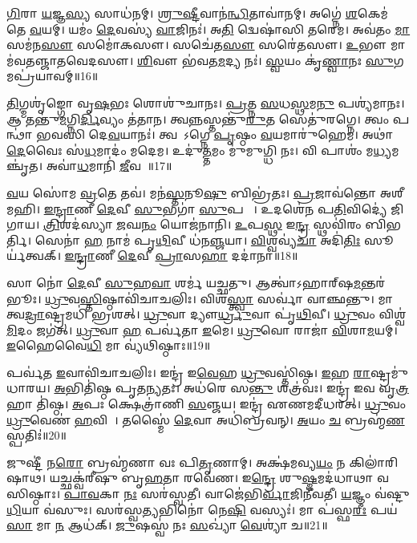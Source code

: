 \ul{𑌗𑌿}𑌰𑌾 \ul{𑌯}𑌜𑍍𑌞\ul{𑌸𑍍𑌯} 𑌸𑌾𑌧॑𑌨𑌮𑍍।
\ul{𑌶𑍍𑌰𑍁}\ul{𑌷𑍍𑌟𑍀}𑌵𑌾𑌨॑\ul{𑌨𑍍𑌧𑌿}𑌤𑌾𑌵𑌾॑𑌨𑌮𑍍।
𑌅𑌗𑍍𑌨𑍇॑ \ul{𑌶}𑌕𑍇𑌮॑ 𑌤𑍇 \ul{𑌵}𑌯𑌮𑍍।
𑌯𑌮𑌂॑ \ul{𑌦𑍇}𑌵𑌸𑍍𑌯॑ \ul{𑌵𑌾}𑌜𑌿𑌨𑌃॑।
𑌅\ul{𑌤𑌿} 𑌦𑍍𑌵𑍇𑌷𑌾॑𑌸𑌿 𑌤𑌰𑍇𑌮।
𑌅𑌵॑𑌤𑌂 \ul{𑌮𑌾} 𑌸𑌮॑𑌨\ul{𑌸𑍗} 𑌸𑌮𑍋॑𑌕𑌸𑍗।
𑌸𑌚𑍇॑𑌤\ul{𑌸𑍗} 𑌸𑌰𑍇॑𑌤𑌸𑍗।
\ul{𑌉}𑌭𑍗 𑌮𑌾𑌮॑𑌵𑌤𑌞𑍍𑌜𑌾𑌤𑌵𑍇𑌦𑌸𑍗।
\ul{𑌶𑌿}𑌵𑍗 𑌭॑𑌵𑌤\ul{𑌮}𑌦𑍍𑌯 𑌨𑌃॑।
\ul{𑌸𑍍𑌵}𑌯𑌂 𑌕𑍃॑\ul{𑌣𑍍𑌵𑌾}𑌨𑌃 \ul{𑌸𑍁}𑌗𑌮𑌪𑍍𑌰॑𑌯𑌾𑌵𑌮𑍍॥16॥

\ul{𑌤𑌿}𑌗𑍍𑌮𑌶𑍃॑𑌙𑍍𑌗𑍋 𑌵𑍃\ul{𑌷}𑌭𑌃 𑌶𑍋𑌶𑍁॑𑌚𑌾𑌨𑌃।
\ul{𑌪𑍍𑌰}𑌤𑍍𑌨 \ul{𑌸}𑌧\ul{𑌸𑍍𑌥}𑌮\ul{𑌨𑍁} 𑌪𑌶𑍍𑌯॑𑌮𑌾𑌨𑌃।
𑌆 𑌤𑌨𑍍𑌤𑍁॑\ul{𑌮}𑌗𑍍𑌨𑌿\ul{𑌰𑍍𑌦𑌿}𑌵𑍍𑌯𑌂 𑌤॑𑌤𑌾𑌨।
𑌤𑍍𑌵\ul{𑌨𑍍𑌨}𑌸𑍍𑌤𑌨𑍍𑌤𑍁॑\ul{𑌰𑍁}𑌤 𑌸𑍇𑌤𑍁॑𑌰𑌗𑍍𑌨𑍇।
𑌤𑍍𑌵𑌂 𑌪𑌨𑍍𑌥𑌾॑ 𑌭𑌵𑌸𑌿 𑌦𑍇\ul{𑌵}𑌯𑌾𑌨𑌃॑।
𑌤𑍍𑌵𑌯𑌾᳚\-𑌽𑌗𑍍𑌨𑍇 \ul{𑌪𑍃}𑌷𑍍𑌠𑌂 \ul{𑌵}𑌯𑌮𑌾𑌰𑍁॑𑌹𑍇𑌮।
𑌅𑌥𑌾॑ \ul{𑌦𑍇}𑌵𑍈𑌃 𑌸॑\ul{𑌧}𑌮𑌾𑌦𑌂॑ 𑌮𑌦𑍇𑌮।
𑌉𑌦𑍁॑\ul{𑌤𑍍𑌤}𑌮𑌂 𑌮𑍁॑𑌮𑍁𑌗𑍍𑌧𑌿 𑌨𑌃।
𑌵𑌿 𑌪𑌾𑌶𑌂॑ 𑌮\ul{𑌧𑍍𑌯}𑌮𑌞𑍍𑌚𑍃॑𑌤।
𑌅𑌵𑌾॑\ul{𑌧}𑌮𑌾𑌨𑌿॑ \ul{𑌜𑍀}𑌵𑌸𑍇᳚॥17॥

\ul{𑌵}𑌯 𑌸𑍋॑𑌮 \ul{𑌵𑍍𑌰}𑌤𑍇 𑌤𑌵॑।
𑌮𑌨॑\ul{𑌸𑍍𑌤}𑌨𑍂\ul{𑌷𑍁} 𑌬𑌿𑌭𑍍𑌰॑𑌤𑌃।
\ul{𑌪𑍍𑌰}𑌜𑌾𑌵॑𑌨𑍍𑌤𑍋 𑌅𑌶𑍀𑌮𑌹𑌿।
\ul{𑌇}\ul{𑌨𑍍𑌦𑍍𑌰𑌾}𑌣𑍀 \ul{𑌦𑍇}𑌵𑍀 \ul{𑌸𑍁}𑌭𑌗𑌾॑ \ul{𑌸𑍁}𑌪𑌤𑍍𑌨𑍀᳚।
𑌉𑌦𑌶𑍇॑𑌨 𑌪\ul{𑌤𑌿}𑌵𑌿𑌦𑍍𑌯𑍇॑ 𑌜𑌿𑌗𑌾𑌯।
\ul{𑌤𑍍𑌰𑌿}\ul{}𑌶𑌦॑𑌸𑍍𑌯𑌾 \ul{𑌜}𑌘\ul{𑌨𑌂} 𑌯𑍋𑌜॑𑌨𑌾𑌨𑌿।
\ul{𑌉}𑌪\ul{𑌸𑍍𑌥} 𑌇\ul{𑌨𑍍𑌦𑍍𑌰}\ul{} 𑌸𑍍𑌥𑌵𑌿॑𑌰𑌂 𑌬𑌿𑌭𑌰𑍍𑌤𑌿।
𑌸𑍇𑌨𑌾॑ \ul{𑌹} 𑌨𑌾𑌮॑ 𑌪𑍃\ul{𑌥𑌿}𑌵𑍀 𑌧॑𑌨\ul{𑌞𑍍𑌜}𑌯𑌾।
\ul{𑌵𑌿}𑌶𑍍𑌵𑌵𑍍𑌯॑\ul{𑌚𑌾} 𑌅𑌦𑌿॑\ul{𑌤𑌿𑌃} 𑌸𑍂𑌰𑍍𑌯॑𑌤𑍍𑌵𑌕𑍍।
\ul{𑌇}\ul{𑌨𑍍𑌦𑍍𑌰𑌾}𑌣𑍀 \ul{𑌦𑍇}𑌵𑍀 \ul{𑌪𑍍𑌰𑌾}𑌸\ul{𑌹𑌾} 𑌦𑌦𑌾॑𑌨𑌾॥18॥

𑌸𑌾 𑌨𑍋॑ \ul{𑌦𑍇}𑌵𑍀 \ul{𑌸𑍁}𑌹\ul{𑌵𑌾} 𑌶𑌰𑍍𑌮॑ 𑌯𑌚𑍍𑌛𑌤𑍁।
𑌆𑌤𑍍𑌵𑌾॑\-𑌽𑌹𑌾𑌰𑍍‌\mbox{}𑌷\ul{𑌮}𑌨𑍍𑌤𑌰॑𑌭𑍂𑌃।
\ul{𑌧𑍍𑌰𑍁}𑌵\ul{𑌸𑍍𑌤𑌿}𑌷𑍍𑌠𑌾𑌵𑌿॑𑌚𑌾𑌚𑌲𑌿𑌃।
𑌵𑌿𑌶॑\ul{𑌸𑍍𑌤𑍍𑌵𑌾} 𑌸𑌰𑍍𑌵𑌾॑ 𑌵𑌾𑌞𑍍𑌛𑌨𑍍𑌤𑍁।
𑌮𑌾 𑌤𑍍𑌵\ul{𑌦𑍍𑌰𑌾}𑌷𑍍𑌟𑍍𑌰𑌮𑌧𑌿॑ 𑌭𑍍𑌰𑌶𑌤𑍍।
\ul{𑌧𑍍𑌰𑍁}𑌵𑌾 𑌦𑍍𑌯𑍗\ul{𑌰𑍍𑌧𑍍𑌰𑍁}𑌵𑌾 𑌪𑍃॑\ul{𑌥𑌿}𑌵𑍀।
\ul{𑌧𑍍𑌰𑍁}𑌵𑌂 𑌵𑌿𑌶𑍍𑌵॑\ul{𑌮𑌿}𑌦𑌂 𑌜𑌗॑𑌤𑍍।
\ul{𑌧𑍍𑌰𑍁}𑌵𑌾 \ul{𑌹} 𑌪𑌰𑍍𑌵॑𑌤𑌾 \ul{𑌇}𑌮𑍇।
\ul{𑌧𑍍𑌰𑍁}𑌵𑍋 𑌰𑌾𑌜𑌾॑ \ul{𑌵𑌿}𑌶𑌾\ul{𑌮}𑌯𑌮𑍍।
\ul{𑌇}𑌹𑍈𑌵𑍈\ul{𑌧𑌿} 𑌮𑌾 𑌵𑍍𑌯॑𑌥𑌿𑌷𑍍𑌠𑌾𑌃॥19॥

𑌪𑌰𑍍𑌵॑𑌤 \ul{𑌇}𑌵𑌾𑌵𑌿॑𑌚𑌾𑌚𑌲𑌿𑌃।
𑌇𑌨𑍍𑌦𑍍𑌰॑ 𑌇\ul{𑌵𑍇}𑌹 \ul{𑌧𑍍𑌰𑍁}𑌵𑌸𑍍𑌤𑌿॑𑌷𑍍𑌠।
\ul{𑌇}𑌹 \ul{𑌰𑌾}𑌷𑍍𑌟𑍍𑌰𑌮𑍁॑ 𑌧𑌾𑌰𑌯।
\ul{𑌅}𑌭𑌿𑌤𑌿॑𑌷𑍍𑌠 𑌪𑍃𑌤\ul{𑌨𑍍𑌯}𑌤𑌃।
𑌅𑌧॑𑌰𑍇 𑌸\ul{𑌨𑍍𑌤𑍁} 𑌶𑌤𑍍𑌰॑𑌵𑌃।
𑌇𑌨𑍍𑌦𑍍𑌰॑ 𑌇𑌵 𑌵𑍃\ul{𑌤𑍍𑌰}𑌹𑌾 𑌤𑌿॑𑌷𑍍𑌠।
\ul{𑌅}𑌪𑌃 𑌕𑍍𑌷𑍇𑌤𑍍𑌰𑌾॑𑌣𑌿 \ul{𑌸}𑌞𑍍𑌜𑌯\sn{}।
𑌇𑌨𑍍𑌦𑍍𑌰॑ 𑌏𑌣𑌮𑌦𑍀𑌧𑌰𑌤𑍍।
\ul{𑌧𑍍𑌰𑍁}𑌵𑌂 \ul{𑌧𑍍𑌰𑍁}𑌵𑍇𑌣॑ \ul{𑌹}𑌵𑌿𑌷𑌾᳚।
𑌤𑌸𑍍𑌮𑍈॑ \ul{𑌦𑍇}𑌵𑌾 𑌅𑌧𑌿॑𑌬𑍍𑌰𑌵𑌨𑍍।
\ul{𑌅}𑌯𑌂 \ul{𑌚} 𑌬𑍍𑌰𑌹𑍍𑌮॑\ul{𑌣}𑌸𑍍𑌪𑌤𑌿𑌃॑॥20॥\anuvakamend[\ul{𑌹}𑌵𑌿𑌰𑍍𑌭𑌿॑\ul{𑌰𑌾}𑌸𑍍𑌯॑𑌮\ul{𑌭𑌿} 𑌦𑌾𑌸॑𑌤𑍋 𑌵𑌿\ul{𑌪}𑌶𑍍𑌚𑌿\ul{𑌤}𑌮𑌪𑍍𑌰॑𑌯𑌾𑌵\ul{𑌞𑍍𑌜𑍀}𑌵\ul{𑌸𑍇} 𑌦𑌦𑌾॑𑌨𑌾 𑌵𑍍𑌯𑌥𑌿𑌷𑍍𑌠𑌾 𑌬𑍍𑌰\ul{𑌵}𑌨𑍍𑌨𑍇𑌕𑌂॑ 𑌚]

𑌜𑍁𑌷𑍍𑌟𑍀॑ 𑌨\ul{𑌰𑍋} 𑌬𑍍𑌰𑌹𑍍𑌮॑𑌣𑌾 𑌵𑌃 𑌪𑌿\ul{𑌤𑍃}𑌣𑌾𑌮𑍍।
𑌅𑌕𑍍𑌷॑𑌮𑌵𑍍𑌯\ul{𑌯𑌂} 𑌨 𑌕𑌿𑌲𑌾॑𑌰𑌿𑌷𑌾𑌥।
𑌯𑌚𑍍𑌛𑌕𑍍𑌵॑𑌰𑍀𑌷𑍁 𑌬𑍃\ul{𑌹}𑌤𑌾 𑌰𑌵𑍇॑𑌣।
𑌇\ul{𑌨𑍍𑌦𑍍𑌰𑍇} 𑌶𑍁\ul{𑌷𑍍𑌮}𑌮𑌦॑𑌧𑌾𑌥𑌾 𑌵𑌸𑌿𑌷𑍍𑌠𑌾𑌃।
\ul{𑌪𑌾}\ul{𑌵}𑌕𑌾 \ul{𑌨𑌃} 𑌸𑌰॑𑌸𑍍𑌵𑌤𑍀।
𑌵𑌾𑌜𑍇॑𑌭𑌿\ul{𑌰𑍍𑌵𑌾}𑌜𑌿𑌨𑍀॑𑌵𑌤𑍀।
\ul{𑌯}𑌜𑍍𑌞𑌂 𑌵॑𑌷𑍍𑌟𑍁 \ul{𑌧𑌿}𑌯𑌾 𑌵॑𑌸𑍁𑌃।
𑌸𑌰॑𑌸𑍍𑌵\ul{𑌤𑍍𑌯}𑌭𑌿𑌨𑍋॑ 𑌨𑍇\ul{𑌷𑌿} 𑌵𑌸𑍍𑌯𑌃॑।
𑌮𑌾 𑌪॑𑌸𑍍𑌫\ul{𑌰𑍀𑌃} 𑌪𑌯॑\ul{𑌸𑌾} 𑌮𑌾 \ul{𑌨} 𑌆𑌧॑𑌕𑍍।
\ul{𑌜𑍁}𑌷𑌸𑍍𑌵॑ 𑌨𑌃 \ul{𑌸}𑌖𑍍𑌯𑌾॑ \ul{𑌵𑍇}𑌶𑍍𑌯𑌾॑ 𑌚॥21॥


